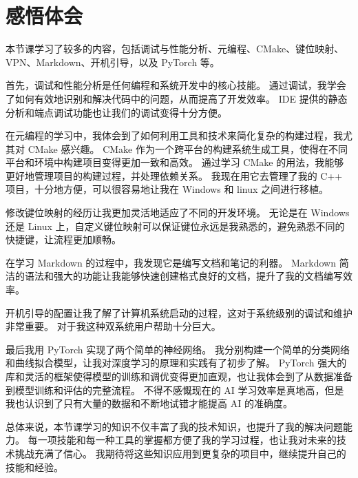 \documentclass[16pt]{lzc}
\begin{document}
    \section{感悟体会}\label{sec:5}
    本节课学习了较多的内容，包括调试与性能分析、元编程、CMake、键位映射、VPN、Markdown、开机引导，以及 PyTorch 等。

    首先，调试和性能分析是任何编程和系统开发中的核心技能。
    通过调试，我学会了如何有效地识别和解决代码中的问题，从而提高了开发效率。
    IDE 提供的静态分析和端点调试功能也让我们的调试变得十分方便。

    在元编程的学习中，我体会到了如何利用工具和技术来简化复杂的构建过程，我尤其对 CMake 感兴趣。
    CMake 作为一个跨平台的构建系统生成工具，使得在不同平台和环境中构建项目变得更加一致和高效。
    通过学习 CMake 的用法，我能够更好地管理项目的构建过程，并处理依赖关系。
    我现在用它去管理了我的 C++ 项目，十分地方便，可以很容易地让我在 Windows 和 linux 之间进行移植。

    修改键位映射的经历让我更加灵活地适应了不同的开发环境。
    无论是在 Windows 还是 Linux 上，自定义键位映射可以保证键位永远是我熟悉的，避免熟悉不同的快捷键，让流程更加顺畅。

    在学习 Markdown 的过程中，我发现它是编写文档和笔记的利器。
    Markdown 简洁的语法和强大的功能让我能够快速创建格式良好的文档，提升了我的文档编写效率。

    开机引导的配置让我了解了计算机系统启动的过程，这对于系统级别的调试和维护非常重要。
    对于我这种双系统用户帮助十分巨大。

    最后我用 PyTorch 实现了两个简单的神经网络。
    我分别构建一个简单的分类网络和曲线拟合模型，让我对深度学习的原理和实践有了初步了解。
    PyTorch 强大的库和灵活的框架使得模型的训练和调优变得更加直观，也让我体会到了从数据准备到模型训练和评估的完整流程。
    不得不感慨现在的 AI 学习效率是真地高，但是我也认识到了只有大量的数据和不断地试错才能提高 AI 的准确度。

    总体来说，本节课学习的知识不仅丰富了我的技术知识，也提升了我的解决问题能力。
    每一项技能和每一种工具的掌握都方便了我的学习过程，也让我对未来的技术挑战充满了信心。
    我期待将这些知识应用到更复杂的项目中，继续提升自己的技能和经验。
\end{document}
